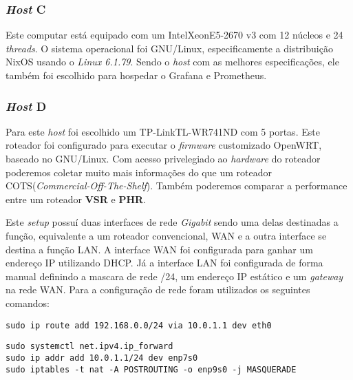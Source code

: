 \subsubsection{\textit{Host} C}
Este computar está equipado com um Intel\textregistered\space Xeon\textregistered\space E5-2670 v3 com 12 núcleos e 24 \textit{threads}.
O sistema operacional foi GNU/Linux, especificamente a distribuição NixOS usando o \textit{Linux 6.1.79}. Sendo o \textit{host} com as melhores especificações, ele também foi escolhido para hospedar o Grafana e Prometheus.


\subsubsection{\textit{Host} D}
Para este \textit{host} foi escolhido um TP-Link\textregistered\space TL-WR741ND com 5 portas. Este roteador foi configurado para executar o \textit{firmware} customizado OpenWRT, baseado no GNU/Linux. Com acesso privelegiado ao \textit{hardware} do roteador poderemos coletar muito mais informações do que um roteador COTS(\textit{Commercial-Off-The-Shelf}). Também poderemos comparar a performance entre um roteador \textbf{VSR} e \textbf{PHR}.

Este \textit{setup} possuí duas interfaces de rede \textit{Gigabit} sendo uma delas destinadas a função, equivalente a um roteador convencional, WAN e a outra interface se destina a função LAN. 
A interface WAN foi configurada para ganhar um endereço IP utilizando DHCP.
Já a interface LAN foi configurada de forma manual definindo a mascara de rede /24, um endereço IP estático e um \textit{gateway} na rede WAN.
Para a configuração de rede foram utilizados os seguintes comandos:

\begin{lstlisting}
sudo ip route add 192.168.0.0/24 via 10.0.1.1 dev eth0
\end{lstlisting}

\begin{lstlisting}
sudo systemctl net.ipv4.ip_forward 
sudo ip addr add 10.0.1.1/24 dev enp7s0 
sudo iptables -t nat -A POSTROUTING -o enp9s0 -j MASQUERADE 
\end{lstlisting}



